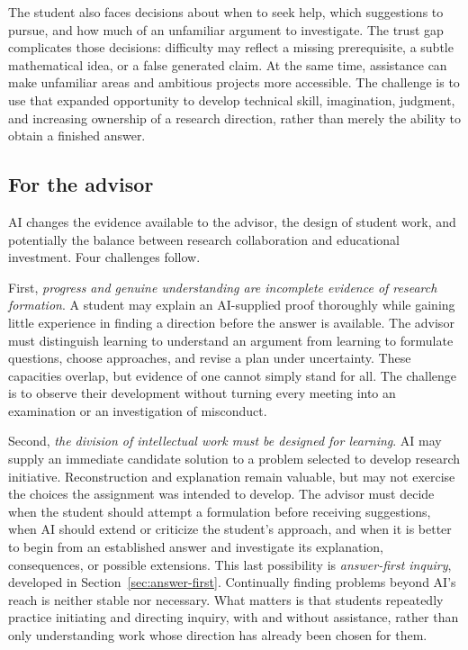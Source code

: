 \documentclass[11pt]{article}
\begin{document}
The student also faces decisions about when to seek help, which suggestions to pursue,
and how much of an unfamiliar argument to investigate. The trust gap complicates those
decisions: difficulty may reflect a missing prerequisite, a subtle mathematical idea,
or a false generated claim. At the same time, assistance can make unfamiliar areas and
ambitious projects more accessible. The challenge is to use that expanded opportunity
to develop technical skill, imagination, judgment, and increasing ownership of a
research direction, rather than merely the ability to obtain a finished answer.

\subsection{For the advisor}

AI changes the evidence available to the advisor, the design of student work, and
potentially the balance between research collaboration and educational investment.
Four challenges follow.

First, \emph{progress and genuine understanding are incomplete evidence of
research formation}. A student may explain an AI-supplied proof thoroughly while gaining
little experience in finding a direction before the answer is available. The advisor
must distinguish learning to understand an argument from learning to formulate
questions, choose approaches, and revise a plan under uncertainty. These capacities
overlap, but evidence of one cannot simply stand for all. The challenge is to observe
their development without turning every meeting into an examination or an investigation
of misconduct.

Second, \emph{the division of intellectual work must be designed for learning}.
AI may supply an immediate candidate solution to a problem selected to develop research
initiative. Reconstruction and explanation remain valuable, but may not exercise the
choices the assignment was intended to develop. The advisor must decide when the student
should attempt a formulation before receiving suggestions, when AI should extend or
criticize the student's approach, and when it is better to begin from an established
answer and investigate its explanation, consequences, or possible extensions.
This last possibility is \emph{answer-first inquiry}, developed in
Section~\ref{sec:answer-first}. Continually finding problems beyond AI's reach is neither stable
nor necessary. What matters is that students repeatedly practice initiating and
directing inquiry, with and without assistance, rather than only understanding work
whose direction has already been chosen for them.
\end{document}
